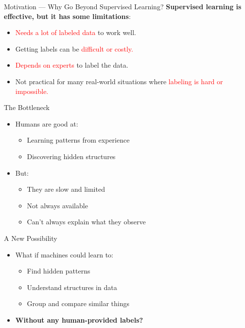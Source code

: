 \begin{frame}{Motivation — Why Go Beyond Supervised Learning?}
    \textbf{Supervised learning is effective, but it has some limitations}:
    \begin{itemize}
        \item \textcolor{red}{Needs a lot of labeled data} to work well.
        \item Getting labels can be \textcolor{red}{difficult or costly.}
        \item \textcolor{red}{Depends on experts} to label the data.
        \item Not practical for many real-world situations where \textcolor{red}{labeling is hard or impossible.}
    \end{itemize}
\end{frame}
\begin{frame}{The Bottleneck}
    \begin{itemize}
        \item Humans are good at:
        \begin{itemize}
            \item Learning patterns from experience
            \item Discovering hidden structures
        \end{itemize}
        \item But:
        \begin{itemize}
            \item They are slow and limited
            \item Not always available
            \item Can't always explain what they observe
        \end{itemize}
    \end{itemize}
\end{frame}

\begin{frame}{A New Possibility}
    \begin{itemize}
        \setlength{\itemsep}{1cm}
        \item What if machines could learn to:
        \begin{itemize}
            \item Find hidden patterns
            \item Understand structures in data
            \item Group and compare similar things
        \end{itemize}
        \item[] {\Large \textbf{Without any human-provided labels?}}
    \end{itemize}
\end{frame}

